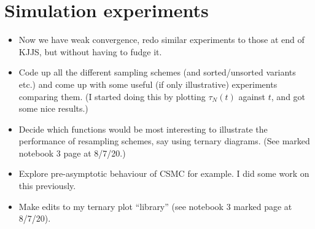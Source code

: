 \documentclass{article}
\begin{document}
\section*{Simulation experiments}
\begin{itemize}
\item Now we have weak convergence, redo similar experiments to those at end of KJJS, but without having to fudge it.
\item Code up all the different sampling schemes (and sorted/unsorted variants etc.) and come up with some useful (if only illustrative) experiments comparing them. (I started doing this by plotting $\tau_N(t)$ against $t$, and got some nice results.)
\item Decide which functions would be most interesting to illustrate the performance of resampling schemes, say using ternary diagrams. (See marked notebook 3 page at 8/7/20.)
\item Explore pre-asymptotic behaviour of CSMC for example. I did some work on this previously.
\item Make edits to my ternary plot ``library'' (see notebook 3 marked page at 8/7/20).
\end{itemize}
\end{document}
